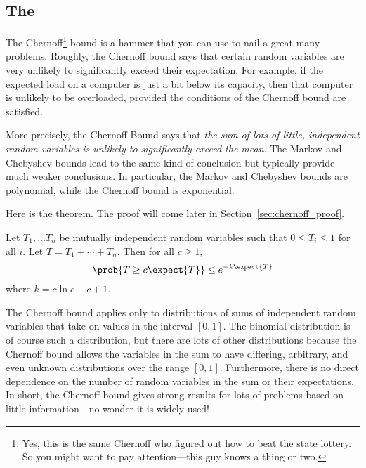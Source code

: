 \subsection{The }

The Chernoff\footnote{Yes, this is the same Chernoff who figured out
  how to beat the state lottery.  So you might want to pay
  attention---this guy knows a thing or two.} bound is a hammer that
you can use to nail a great many problems.  Roughly, the Chernoff
bound says that certain random variables are very unlikely to
significantly exceed their expectation.  For example, if the expected
load on a computer is just a bit below its capacity, then that
computer is unlikely to be overloaded, provided the conditions of the
Chernoff bound are satisfied.

More precisely, the Chernoff Bound says that \emph{the sum of lots of
  little, independent random variables is unlikely to significantly
  exceed the mean}.  The Markov and Chebyshev bounds lead to the same
kind of conclusion but typically provide much weaker conclusions.  In
particular, the Markov and Chebyshev bounds are polynomial, while the
Chernoff bound is exponential.

Here is the theorem.  The proof will come later in
Section~\ref{sec:chernoff_proof}.

\begin{theorem}
\label{chernoff}
Let $T_1, \dots T_n$ be mutually independent random variables such
that $0 \leq T_i \leq 1$ for all $i$.  Let $T = T_1 + \cdots + T_n$.
Then for all $c \geq 1$,
\begin{equation}\label{chernoff-leq}
\prob{T \geq c \expect{T}} \leq e^{-k \expect{T}}
\end{equation}
where $k = c \ln c - c + 1$.
\end{theorem}

The Chernoff bound applies only to distributions of sums of
independent random variables that take on values in the interval $[0,
  1]$.  The binomial distribution is of course such a distribution,
but there are lots of other distributions because the Chernoff bound
allows the variables in the sum to have differing, arbitrary, and even
unknown distributions over the range $[0, 1]$.  Furthermore, there is
no direct dependence on the number of random variables in the sum or
their expectations.  In short, the Chernoff bound gives strong results
for lots of problems based on little information---no wonder it is
widely used!

